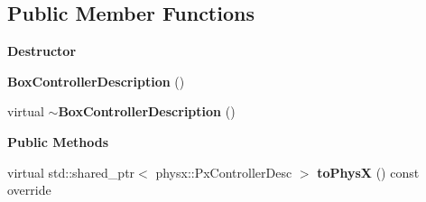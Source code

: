 \subsection*{Public Member Functions}
\begin{Indent}\textbf{ Destructor}\par
\begin{DoxyCompactItemize}
\item 
\mbox{\label{classrev_1_1_box_controller_description_a5183f05cdde5a5532d32e7bdd788464d}} 
{\bfseries Box\+Controller\+Description} ()
\item 
\mbox{\label{classrev_1_1_box_controller_description_a98a2b0e06f0a2d4b5cb8faf5b4ea8746}} 
virtual {\bfseries $\sim$\+Box\+Controller\+Description} ()
\end{DoxyCompactItemize}
\end{Indent}
\begin{Indent}\textbf{ Public Methods}\par
\begin{DoxyCompactItemize}
\item 
\mbox{\label{classrev_1_1_box_controller_description_af5e46420853ca0891b201cb502caf82f}} 
virtual std\+::shared\+\_\+ptr$<$ physx\+::\+Px\+Controller\+Desc $>$ {\bfseries to\+PhysX} () const override
\end{DoxyCompactItemize}
\end{Indent}

